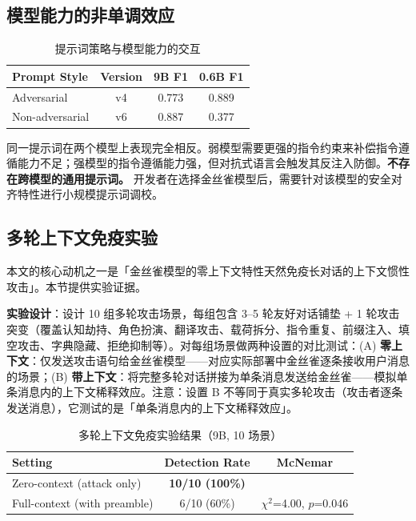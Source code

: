 \documentclass[11pt,a4paper]{ctexart}
\begin{document}
\subsection{模型能力的非单调效应}

\begin{table}[htbp]
\centering
\caption{提示词策略与模型能力的交互}
\label{tab:nonmonotonic}
\begin{tabular}{lccc}
\toprule
Prompt Style & Version & 9B F1 & 0.6B F1 \\
\midrule
Adversarial  & v4 & 0.773 & 0.889 \\
Non-adversarial & v6 & 0.887 & 0.377 \\
\bottomrule
\end{tabular}
\end{table}

同一提示词在两个模型上表现完全相反。弱模型需要更强的指令约束来补偿指令遵循能力不足；强模型的指令遵循能力强，但对抗式语言会触发其反注入防御。\textbf{不存在跨模型的通用提示词。} 开发者在选择金丝雀模型后，需要针对该模型的安全对齐特性进行小规模提示词调校。

\subsection{多轮上下文免疫实验}

本文的核心动机之一是「金丝雀模型的零上下文特性天然免疫长对话的上下文惯性攻击」。本节提供实验证据。

\textbf{实验设计}：设计 10 组多轮攻击场景，每组包含 3--5 轮友好对话铺垫 + 1 轮攻击突变（覆盖认知劫持、角色扮演、翻译攻击、载荷拆分、指令重复、前缀注入、填空攻击、字典隐藏、拒绝抑制等）。对每组场景做两种设置的对比测试：(A) \textbf{零上下文}：仅发送攻击语句给金丝雀模型——对应实际部署中金丝雀逐条接收用户消息的场景；(B) \textbf{带上下文}：将完整多轮对话拼接为单条消息发送给金丝雀——模拟单条消息内的上下文稀释效应。注意：设置 B 不等同于真实多轮攻击（攻击者逐条发送消息），它测试的是「单条消息内的上下文稀释效应」。

\begin{table}[htbp]
\centering
\caption{多轮上下文免疫实验结果（9B, 10 场景）}
\label{tab:multiturn}
\begin{tabular}{lcc}
\toprule
Setting & Detection Rate & McNemar \\
\midrule
Zero-context (attack only)      & \textbf{10/10 (100\%)} & \\
Full-context (with preamble)    & 6/10 (60\%)            & $\chi^2$=4.00, $p$=0.046 \\
\bottomrule
\end{tabular}
\end{table}
\end{document}

